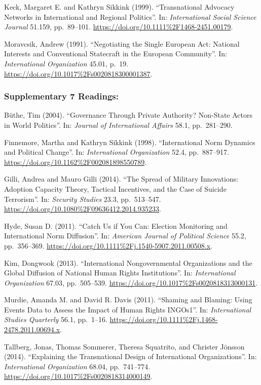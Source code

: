 \documentclass[10pt,]{article}
\begin{document}
Keck, Margaret E. and Kathryn Sikkink (1999). ``Transnational Advocacy
Networks in International and Regional Politics''. In:
\emph{International Social Science Journal} 51.159, pp.~89--101.
\url{https://doi.org/10.1111\%2F1468-2451.00179}.

Moravcsik, Andrew (1991). ``Negotiating the Single European Act:
National Interests and Conventional Statecraft in the European
Community''. In: \emph{International Organization} 45.01, p.~19.
\url{https://doi.org/10.1017\%2Fs0020818300001387}.

\subsubsection{Supplementary \textbar{} 7
Readings:}\label{supplementary-7-readings}

Büthe, Tim (2004). ``Governance Through Private Authority? Non-State
Actors in World Politics''. In: \emph{Journal of International Affairs}
58.1, pp.~281--290.

Finnemore, Martha and Kathryn Sikkink (1998). ``International Norm
Dynamics and Political Change''. In: \emph{International Organization}
52.4, pp.~887--917. \url{https://doi.org/10.1162\%2F002081898550789}.

Gilli, Andrea and Mauro Gilli (2014). ``The Spread of Military
Innovations: Adoption Capacity Theory, Tactical Incentives, and the Case
of Suicide Terrorism''. In: \emph{Security Studies} 23.3, pp.~513--547.
\url{https://doi.org/10.1080\%2F09636412.2014.935233}.

Hyde, Susan D. (2011). ``Catch Us if You Can: Election Monitoring and
International Norm Diffusion''. In:
\emph{American Journal of Political Science} 55.2, pp.~356--369.
\url{https://doi.org/10.1111\%2Fj.1540-5907.2011.00508.x}.

Kim, Dongwook (2013). ``International Nongovernmental Organizations and
the Global Diffusion of National Human Rights Institutions''. In:
\emph{International Organization} 67.03, pp.~505--539.
\url{https://doi.org/10.1017\%2Fs0020818313000131}.

Murdie, Amanda M. and David R. Davis (2011). ``Shaming and Blaming:
Using Events Data to Assess the Impact of Human Rights INGOs1''. In:
\emph{International Studies Quarterly} 56.1, pp.~1--16.
\url{https://doi.org/10.1111\%2Fj.1468-2478.2011.00694.x}.

Tallberg, Jonas, Thomas Sommerer, Theresa Squatrito, and Christer
Jönsson (2014). ``Explaining the Transnational Design of International
Organizations''. In: \emph{International Organization} 68.04,
pp.~741--774. \url{https://doi.org/10.1017\%2Fs0020818314000149}.
\end{document}
